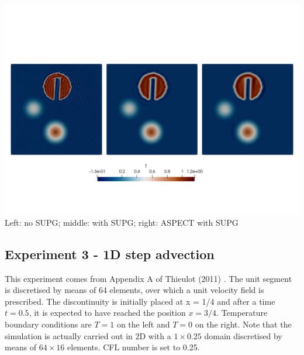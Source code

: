 \begin{center}
\includegraphics[width=15cm]{python_codes/fieldstone_43/results/experiment2/Temps}\\
{\captionfont Left: no SUPG; middle: with SUPG; right: ASPECT with SUPG}
\end{center}


\subsection*{Experiment 3 - 1D step advection}

This experiment comes from Appendix A of Thieulot (2011) \cite{thie11}.
The unit segment is discretised by means of 64 elements, 
over which a unit velocity field is prescribed.
The discontinuity is initially
placed at x = 1/4 and after a time $t=0.5$, it is expected to have
reached the position $x=3/4$.
Temperature boundary conditions are $T=1$ on the left and $T=0$ on the right. 
Note that the simulation is actually carried out in 2D with a $1\times0.25$ domain 
discretised by means of $64\times16$ elements.
CFL number is set to 0.25.




